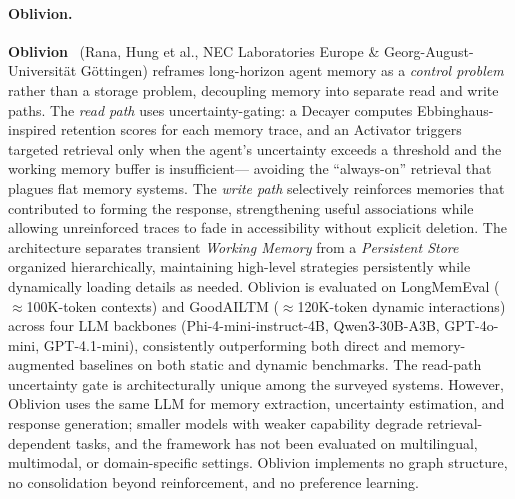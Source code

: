 \paragraph{Oblivion.}
\textbf{Oblivion}~\cite{oblivion2026} (Rana, Hung et al., NEC
Laboratories Europe \& Georg-August-Universit\"at G\"ottingen) reframes
long-horizon agent memory as a \emph{control problem} rather than a
storage problem, decoupling memory into separate read and write paths.
The \emph{read path} uses uncertainty-gating: a Decayer computes
Ebbinghaus-inspired retention scores for each memory trace, and an
Activator triggers targeted retrieval only when the agent's uncertainty
exceeds a threshold and the working memory buffer is insufficient---
avoiding the ``always-on'' retrieval that plagues flat memory systems.
The \emph{write path} selectively reinforces memories that contributed to
forming the response, strengthening useful associations while allowing
unreinforced traces to fade in accessibility without explicit deletion.
The architecture separates transient \emph{Working Memory} from a
\emph{Persistent Store} organized hierarchically, maintaining high-level
strategies persistently while dynamically loading details as needed.
Oblivion is evaluated on LongMemEval (${\approx}$100K-token contexts)
and GoodAILTM (${\approx}$120K-token dynamic interactions) across four
LLM backbones (Phi-4-mini-instruct-4B, Qwen3-30B-A3B, GPT-4o-mini,
GPT-4.1-mini), consistently outperforming both direct and
memory-augmented baselines on both static and dynamic benchmarks.  The
read-path uncertainty gate is architecturally unique among the surveyed
systems.  However, Oblivion uses the same LLM for memory extraction,
uncertainty estimation, and response generation; smaller models with
weaker capability degrade retrieval-dependent tasks, and the framework
has not been evaluated on multilingual, multimodal, or domain-specific
settings.  Oblivion implements no graph structure, no consolidation
beyond reinforcement, and no preference learning.

